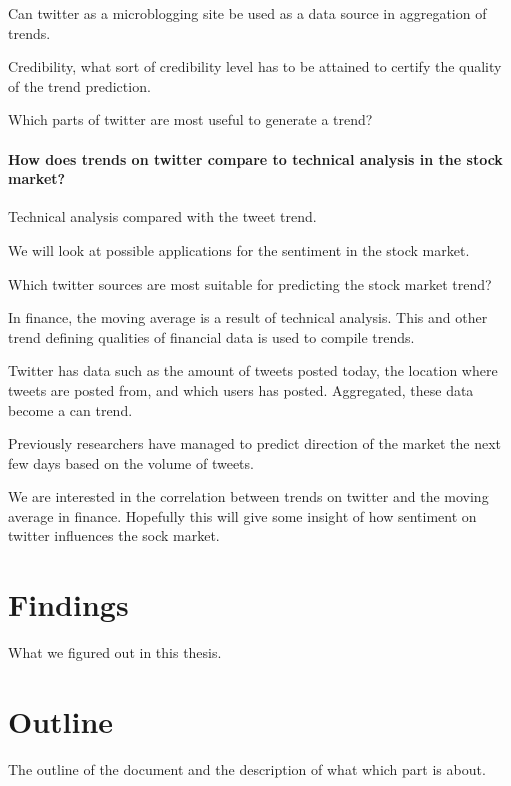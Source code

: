 Can twitter as a microblogging site be used as a data source in aggregation of trends.

Credibility, what sort of credibility level has to be attained to certify the
quality of the trend prediction. 

Which parts of twitter are most useful to generate a trend?

\paragraph{How does trends on twitter compare to technical analysis in the
stock market?\\}
Technical analysis compared with the tweet trend.

We will look at possible applications for the sentiment in the stock market.

Which twitter sources are most suitable for predicting the stock market
trend?

In finance, the moving average is a result of technical analysis. This and
other trend defining qualities of financial data is used to compile trends. 

Twitter has data such as the amount of tweets posted today, the location where
tweets are posted from, and which users has posted. Aggregated, these data
become a can trend. 

Previously researchers have managed to predict direction of the market the
next few days based on the volume of tweets. 

We are interested in the correlation between trends on twitter and the moving
average in finance. Hopefully this will give some insight of how sentiment on
twitter influences the sock market.  

\section{Findings}
What we figured out in this thesis. 

\section{Outline}
The outline of the document and the description of what which part is about. 


